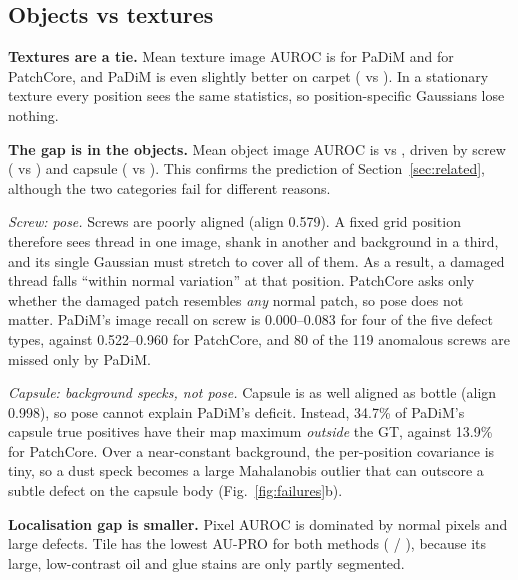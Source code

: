 \subsection{Objects vs textures}
\textbf{Textures are a tie.}
Mean texture image AUROC is \pdImgAurocTex{} for PaDiM and \pcImgAurocTex{} for PatchCore, and PaDiM is even slightly better on carpet (\pdImgAurocCarpet{} vs \pcImgAurocCarpet{}).
In a stationary texture every position sees the same statistics, so position-specific Gaussians lose nothing.

\textbf{The gap is in the objects.}
Mean object image AUROC is \pdImgAurocObj{} vs \pcImgAurocObj{}, driven by screw (\pdImgAurocScrew{} vs \pcImgAurocScrew{}) and capsule (\pdImgAurocCapsule{} vs \pcImgAurocCapsule{}).
This confirms the prediction of Section~\ref{sec:related}, although the two categories fail for different reasons.

\emph{Screw: pose.}
Screws are poorly aligned (align 0.579).
A fixed grid position therefore sees thread in one image, shank in another and background in a third, and its single Gaussian must stretch to cover all of them.
As a result, a damaged thread falls ``within normal variation'' at that position.
PatchCore asks only whether the damaged patch resembles \emph{any} normal patch, so pose does not matter.
PaDiM's image recall on screw is 0.000--0.083 for four of the five defect types, against 0.522--0.960 for PatchCore, and 80 of the 119 anomalous screws are missed only by PaDiM.

\emph{Capsule: background specks, not pose.}
Capsule is as well aligned as bottle (align 0.998), so pose cannot explain PaDiM's deficit.
Instead, 34.7\% of PaDiM's capsule true positives have their map maximum \emph{outside} the GT, against 13.9\% for PatchCore.
Over a near-constant background, the per-position covariance is tiny, so a dust speck becomes a large Mahalanobis outlier that can outscore a subtle defect on the capsule body (Fig.~\ref{fig:failures}b).

\textbf{Localisation gap is smaller.}
Pixel AUROC is dominated by normal pixels and large defects.
Tile has the lowest AU-PRO for both methods (\pdAuproTile{} / \pcAuproTile{}), because its large, low-contrast oil and glue stains are only partly segmented.

